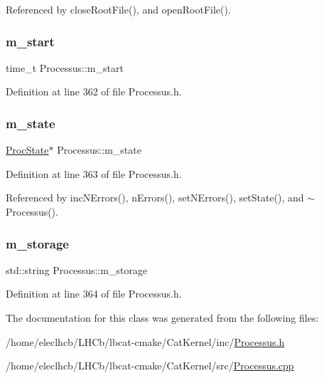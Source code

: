 Referenced by close\+Root\+File(), and open\+Root\+File().

\mbox{\label{classProcessus_a8ec00b2e12c5beada932610f30218e93}} 
\subsubsection{\texorpdfstring{m\+\_\+start}{m\_start}}
{\footnotesize\ttfamily time\+\_\+t Processus\+::m\+\_\+start\hspace{0.3cm}{\ttfamily [private]}}



Definition at line 362 of file Processus.\+h.

\mbox{\label{classProcessus_ab3539eee42891ceae0baf4395ae7fb61}} 
\subsubsection{\texorpdfstring{m\+\_\+state}{m\_state}}
{\footnotesize\ttfamily \hyperlink{structProcState}{Proc\+State}$\ast$ Processus\+::m\+\_\+state\hspace{0.3cm}{\ttfamily [private]}}



Definition at line 363 of file Processus.\+h.



Referenced by inc\+N\+Errors(), n\+Errors(), set\+N\+Errors(), set\+State(), and $\sim$\+Processus().

\mbox{\label{classProcessus_a132b1e71f72327e5a87f0a168c7b6325}} 
\subsubsection{\texorpdfstring{m\+\_\+storage}{m\_storage}}
{\footnotesize\ttfamily std\+::string Processus\+::m\+\_\+storage\hspace{0.3cm}{\ttfamily [private]}}



Definition at line 364 of file Processus.\+h.



The documentation for this class was generated from the following files\+:\begin{DoxyCompactItemize}
\item 
/home/eleclhcb/\+L\+H\+Cb/lbcat-\/cmake/\+Cat\+Kernel/inc/\hyperlink{Processus_8h}{Processus.\+h}\item 
/home/eleclhcb/\+L\+H\+Cb/lbcat-\/cmake/\+Cat\+Kernel/src/\hyperlink{Processus_8cpp}{Processus.\+cpp}\end{DoxyCompactItemize}
